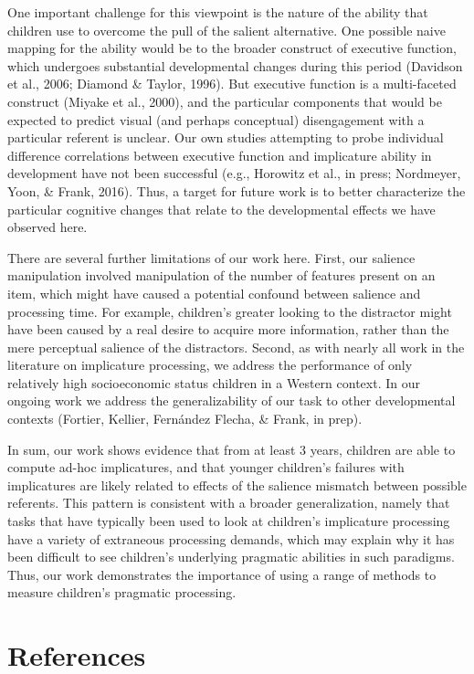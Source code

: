 \documentclass[man]{apa6}
\theoremstyle{definition}
\theoremstyle{definition}
\theoremstyle{definition}
\theoremstyle{remark}
\begin{document}
One important challenge for this viewpoint is the nature of the ability
that children use to overcome the pull of the salient alternative. One
possible naive mapping for the ability would be to the broader construct
of executive function, which undergoes substantial developmental changes
during this period (Davidson et al., 2006; Diamond \& Taylor, 1996). But
executive function is a multi-faceted construct (Miyake et al., 2000),
and the particular components that would be expected to predict visual
(and perhaps conceptual) disengagement with a particular referent is
unclear. Our own studies attempting to probe individual difference
correlations between executive function and implicature ability in
development have not been successful (e.g., Horowitz et al., in press;
Nordmeyer, Yoon, \& Frank, 2016). Thus, a target for future work is to
better characterize the particular cognitive changes that relate to the
developmental effects we have observed here.

There are several further limitations of our work here. First, our
salience manipulation involved manipulation of the number of features
present on an item, which might have caused a potential confound between
salience and processing time. For example, children's greater looking to
the distractor might have been caused by a real desire to acquire more
information, rather than the mere perceptual salience of the
distractors. Second, as with nearly all work in the literature on
implicature processing, we address the performance of only relatively
high socioeconomic status children in a Western context. In our ongoing
work we address the generalizability of our task to other developmental
contexts (Fortier, Kellier, Fernández Flecha, \& Frank, in prep).

In sum, our work shows evidence that from at least 3 years, children are
able to compute ad-hoc implicatures, and that younger children's
failures with implicatures are likely related to effects of the salience
mismatch between possible referents. This pattern is consistent with a
broader generalization, namely that tasks that have typically been used
to look at children's implicature processing have a variety of
extraneous processing demands, which may explain why it has been
difficult to see children's underlying pragmatic abilities in such
paradigms. Thus, our work demonstrates the importance of using a range
of methods to measure children's pragmatic processing.

\newpage

\section{References}\label{references}
\end{document}
